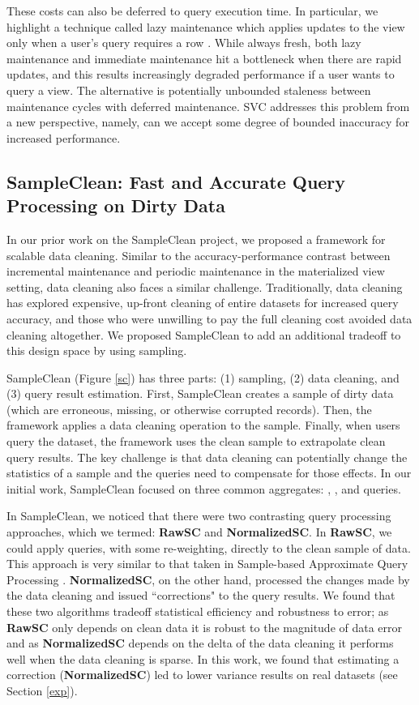 These costs can also be deferred to query execution time.
In particular, we highlight a technique called lazy maintenance which applies updates to the view only when a user's query requires a row \cite{zhou2007lazy}.
While always fresh, both lazy maintenance and immediate maintenance hit a bottleneck when there are rapid updates, and this results increasingly degraded performance if a user wants to query a view.
The alternative is potentially unbounded staleness between maintenance cycles with deferred maintenance.
SVC addresses this problem from a new perspective, namely, can we accept some degree of bounded inaccuracy for increased performance.

\subsection{SampleClean: Fast and Accurate Query Processing on Dirty Data}
In our prior work on the SampleClean project, we proposed a framework for scalable data cleaning.
Similar to the accuracy-performance contrast between incremental maintenance and periodic maintenance in the materialized view setting, data cleaning also faces a similar challenge.
Traditionally, data cleaning has explored expensive, up-front cleaning of entire datasets for increased query accuracy, and those who were unwilling to pay the full cleaning cost avoided data cleaning altogether.
We proposed SampleClean to add an additional tradeoff to this design space by using sampling.

SampleClean (Figure \ref{sc}) has three parts: (1) sampling, (2) data cleaning, and (3) query result estimation.
First, SampleClean creates a sample of dirty data (which are erroneous, missing, or otherwise corrupted records).
Then, the framework applies a data cleaning operation to the sample.
Finally, when users query the dataset, the framework uses the clean sample to extrapolate clean query results.
The key challenge is that data cleaning can potentially change the statistics of a sample and the queries need to compensate for those effects.
In our initial work, SampleClean focused on three common aggregates: \sumfunc, \avgfunc, and \countfunc queries.

In SampleClean, we noticed that there were two contrasting query processing approaches, which we termed: \textbf{RawSC} and \textbf{NormalizedSC}.
In \textbf{RawSC}, we could apply queries, with some re-weighting, directly to the clean sample of data.
This approach is very similar to that taken in Sample-based Approximate Query Processing \cite{OlkenR86,AgarwalMPMMS13, joshi2008materialized}.
\textbf{NormalizedSC}, on the other hand, processed the changes made by the data cleaning and issued ``corrections" to the query results.
We found that these two algorithms tradeoff statistical efficiency and robustness to error; as \textbf{RawSC} only depends on clean data it is robust to the magnitude of data error and as \textbf{NormalizedSC} depends on the delta of the data cleaning it performs well when the data cleaning is sparse. 
In this work, we found that estimating a correction (\textbf{NormalizedSC}) led to lower variance results on real datasets (see Section \ref{exp}). 

